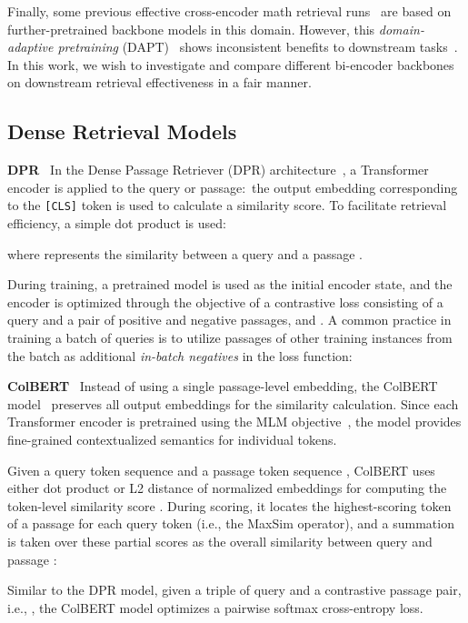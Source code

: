 \documentclass[11pt]{article}
\begin{document}
Finally, some previous effective cross-encoder math retrieval runs~\cite{reusch2021tu_dbs} are based on further-pretrained backbone models in this domain.
However, this \textit{domain-adaptive pretraining} (DAPT)~\cite{gururangan2020dontstoppretrain} shows inconsistent benefits to downstream tasks~\cite{zhu2021notalwayshelp}.
In this work, we wish to investigate and compare different bi-encoder backbones on downstream retrieval effectiveness in a fair manner.

\subsection{Dense Retrieval Models}
\label{sect:models}
\smallskip \noindent
\textbf{DPR} \ 
In the Dense Passage Retriever (DPR) architecture~\cite{karpukhin2020dpr}, a Transformer encoder  is applied to the query or passage:\ the output embedding corresponding to the \texttt{[CLS]} token is used to calculate a similarity score.
To facilitate retrieval efficiency, a simple dot product is used:

\noindent where  represents the similarity between a query  and a passage .

During training, a pretrained model is used as the initial encoder state, and the encoder is optimized through the objective of a contrastive loss consisting of a query and a pair of positive and negative passages,  and .
A common practice in training a batch of queries  is to utilize passages of other training instances from the batch as additional  \textit{in-batch negatives} in the loss function:


\smallskip \noindent
\textbf{ColBERT} \ Instead of using a single passage-level embedding, the ColBERT model~\cite{khattab2020colbert,santhanam2021colbertv2} preserves all output embeddings for the similarity calculation.
Since each Transformer encoder is pretrained using the MLM objective~\cite{devlin2019bert}, the model provides fine-grained contextualized semantics for individual tokens.

Given a query token sequence  and a passage token sequence , ColBERT uses either dot product or L2 distance of normalized embeddings for computing the token-level similarity score .
During scoring, it locates the highest-scoring token of a passage  for each query token  (i.e., the MaxSim operator), and a summation is taken over these partial scores as the overall similarity between query  and passage :

Similar to the DPR model, given a triple of query and a contrastive passage pair, i.e., , the ColBERT model optimizes a pairwise softmax cross-entropy loss.
\end{document}
